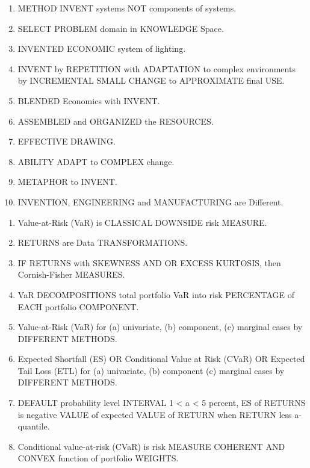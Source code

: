 \begin{enumerate}
	\item METHOD INVENT systems NOT components of systems. \cite{key1000}
	\item SELECT PROBLEM domain in KNOWLEDGE Space.\cite{key1000}
	\item INVENTED ECONOMIC system of lighting. \cite{key1000}
	\item INVENT by REPETITION with ADAPTATION to complex environments by INCREMENTAL SMALL CHANGE to APPROXIMATE final USE.\cite{key1000}
	\item BLENDED Economics with INVENT. \cite{key1000}
	\item ASSEMBLED and ORGANIZED the RESOURCES. \cite{key1000}
	\item EFFECTIVE DRAWING. \cite{key1000}
	\item ABILITY ADAPT to COMPLEX change. \cite{key1000}
	\item METAPHOR to INVENT. \cite{key1000}
	\item INVENTION, ENGINEERING and MANUFACTURING are Different. \cite{key1000}
\end{enumerate}

\begin{enumerate}
	\item Value-at-Risk (VaR) is CLASSICAL DOWNSIDE risk MEASURE.\cite{key100}
	\item RETURNS are Data TRANSFORMATIONS. \cite{key100}
	\item IF RETURNS with SKEWNESS AND OR EXCESS KURTOSIS, then Cornish-Fisher MEASURES. \cite{key100}
	\item VaR DECOMPOSITIONS total portfolio VaR into risk PERCENTAGE of EACH portfolio COMPONENT. \cite{key100}
	\item Value-at-Risk (VaR) for (a) univariate, (b) component, (c) marginal cases by DIFFERENT METHODS. \cite{key100}
	\item Expected Shortfall (ES) OR Conditional Value at Risk (CVaR) OR Expected Tail Loss (ETL) for (a) univariate, (b) component (c) marginal cases by DIFFERENT METHODS. \cite{key100}
	\item DEFAULT probability level INTERVAL 1 < a < 5 percent, ES of RETURNS is negative VALUE of expected VALUE of RETURN when RETURN less a-quantile.  \cite{key100}
	\item Conditional value-at-risk (CVaR) is risk MEASURE COHERENT AND CONVEX function of portfolio WEIGHTS. \cite{key100}
\end{enumerate}


